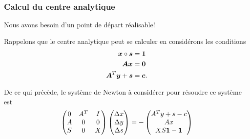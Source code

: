 \documentclass[usepdftitle=false, aspectratio=169]{beamer}
\begin{document}







\begin{frame}
	\frametitle{Calcul du centre analytique}

Nous avons besoin d'un point de départ réalisable!

\mbox{}
	
	Rappelons que le centre analytique peut se calculer en considérons les conditions
	\begin{align*}
		{\boldsymbol{x}} \circ {\boldsymbol{s}} &= {\boldsymbol{1}} \\
		{\boldsymbol{A}}{\boldsymbol{x}} &= {\boldsymbol{0}} \\
		{\boldsymbol{A}}^T{\boldsymbol{y}} + {\boldsymbol{s}} & = {\boldsymbol{c}}.
	\end{align*}

\mbox{}

De ce qui précède, le système de Newton à considérer pour résoudre ce système est
$$
\begin{pmatrix}
	0 & A^T & I \\
	A & 0 & 0 \\
	S & 0 & X
\end{pmatrix}
\begin{pmatrix}
	\Delta x \\ \Delta y \\ \Delta s
\end{pmatrix}
=
-
\begin{pmatrix}
	A^Ty+s-c \\ Ax \\ XS{\boldsymbol{1}} - {\boldsymbol{1}}
\end{pmatrix}
$$
	
\end{frame}
\end{document}
